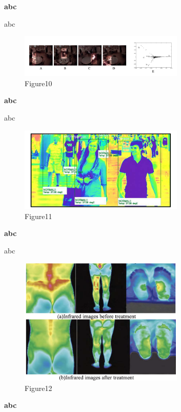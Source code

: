 \documentclass[12pt]{article}
\begin{document}
\noindent \textbf{abc}

\noindent abc

\begin{figure}[H]
\centering
\includegraphics[width=0.7\textwidth]{Paper6.pic.jpg}
\caption{Figure10} 
\end{figure}

\noindent \textbf{abc}

\noindent abc

\begin{figure}[H]
\centering
\includegraphics[width=0.7\textwidth]{Paper7.pic.jpg}
\caption{Figure11} 
\end{figure}

\noindent \textbf{abc}

\noindent abc

\begin{figure}[H]
\centering
\includegraphics[width=0.7\textwidth]{Paper8.pic.jpg}
\caption{Figure12} 
\end{figure}
    
\noindent \textbf{abc}
\end{document}

